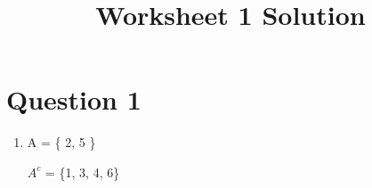 \documentclass[12pt]{article}
\begin{document}
\title{Worksheet 1 Solution}
\maketitle

\section*{Question 1}

\begin{enumerate}
    \item A = \{ 2, 5 \}

        $A^c$ = \{1, 3, 4, 6\}
\end{enumerate}
\end{document}
